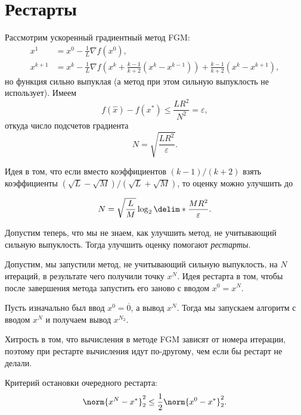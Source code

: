 \section{Рестарты}

Рассмотрим ускоренный градиентный метод FGM:
\begin{align*}
    x^1 &= x^0 - \frac{1}{L} \nabla f(x^0), \\
    x^{k + 1} &= x^k - \frac{1}{L} \nabla f(x^k + \frac{k - 1}{k + 2}(x^k - x^{k - 1})) + \frac{k - 1}{k + 2}(x^k - x^{k + 1}),
\end{align*}
но функция сильно выпуклая (а метод при этом сильную выпуклость не использует). Имеем
\begin{equation*}
     f(\hat x) - f(x^*) \leq \frac{LR^2}{N^2} = \varepsilon,
\end{equation*}
откуда число подсчетов градиента
\begin{equation*}
    N = \sqrt{\frac{LR^2}{\varepsilon}}.
\end{equation*}

Идея в том, что если вместо коэффициентов $(k - 1) / (k + 2)$ взять коэффициенты $(\sqrt L - \sqrt M) / (\sqrt L + \sqrt M)$, то оценку можно улучшить до

\begin{equation*}
    N = \sqrt{\frac{L}{M}}\log_2 \delim*{\frac{MR^2}{\varepsilon}}.
\end{equation*}

Допустим теперь, что мы не знаем, как улучшить метод, не учитывающий сильную выпуклость. Тогда улучшить оценку помогают \textit{рестарты}.

Допустим, мы запустили метод, не учитывающий сильную выпуклость, на $N$ итераций, в результате чего получили точку $x^N$. Идея рестарта в том, чтобы после завершения метода запустить его заново с вводом $x^0 = x^N$. 

Пусть изначально был ввод $x^0 = \overline{0}$, а вывод $x^N$. Тогда мы запускаем алгоритм с вводом $x^N$ и получаем вывод $x^{N_2}$.

Хитрость в том, что вычисления в методе FGM зависят от номера итерации, поэтому при рестарте вычисления идут по-другому, чем если бы рестарт не делали.

Критерий остановки очередного рестарта:
\begin{equation*}
    \norm{x^N - x^*}_2^2 \leq \frac{1}{2}\norm{x^0 - x^*}_2^2.
\end{equation*}


